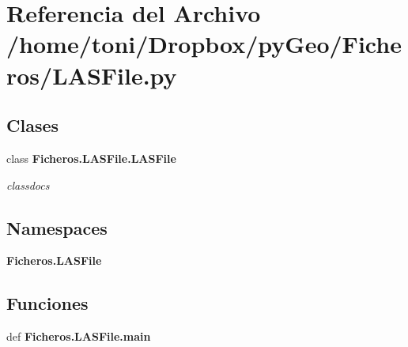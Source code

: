 \section{Referencia del Archivo /home/toni/\-Dropbox/py\-Geo/\-Ficheros/\-L\-A\-S\-File.py}
\label{LASFile_8py}
\subsection*{Clases}
\begin{DoxyCompactItemize}
\item 
class {\bf Ficheros.\-L\-A\-S\-File.\-L\-A\-S\-File}
\begin{DoxyCompactList}\small\item\em classdocs \end{DoxyCompactList}\end{DoxyCompactItemize}
\subsection*{Namespaces}
\begin{DoxyCompactItemize}
\item 
{\bf Ficheros.\-L\-A\-S\-File}
\end{DoxyCompactItemize}
\subsection*{Funciones}
\begin{DoxyCompactItemize}
\item 
def {\bf Ficheros.\-L\-A\-S\-File.\-main}
\end{DoxyCompactItemize}

